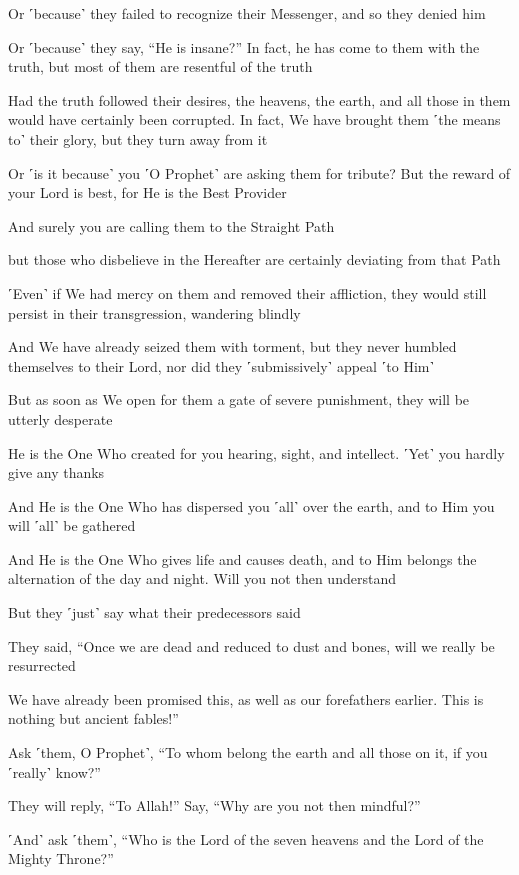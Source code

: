 Or ˹because˺ they failed to recognize their Messenger, and so they denied him

Or ˹because˺ they say, “He is insane?” In fact, he has come to them with the truth, but most of them are resentful of the truth

Had the truth followed their desires, the heavens, the earth, and all those in them would have certainly been corrupted. In fact, We have brought them ˹the means to˺ their glory, but they turn away from it

Or ˹is it because˺ you ˹O Prophet˺ are asking them for tribute? But the reward of your Lord is best, for He is the Best Provider

And surely you are calling them to the Straight Path

but those who disbelieve in the Hereafter are certainly deviating from that Path

˹Even˺ if We had mercy on them and removed their affliction, they would still persist in their transgression, wandering blindly

And We have already seized them with torment, but they never humbled themselves to their Lord, nor did they ˹submissively˺ appeal ˹to Him˺

But as soon as We open for them a gate of severe punishment, they will be utterly desperate

He is the One Who created for you hearing, sight, and intellect. ˹Yet˺ you hardly give any thanks

And He is the One Who has dispersed you ˹all˺ over the earth, and to Him you will ˹all˺ be gathered

And He is the One Who gives life and causes death, and to Him belongs the alternation of the day and night. Will you not then understand

But they ˹just˺ say what their predecessors said

They said, “Once we are dead and reduced to dust and bones, will we really be resurrected

We have already been promised this, as well as our forefathers earlier. This is nothing but ancient fables!”

Ask ˹them, O Prophet˺, “To whom belong the earth and all those on it, if you ˹really˺ know?”

They will reply, “To Allah!” Say, “Why are you not then mindful?”

˹And˺ ask ˹them˺, “Who is the Lord of the seven heavens and the Lord of the Mighty Throne?”

